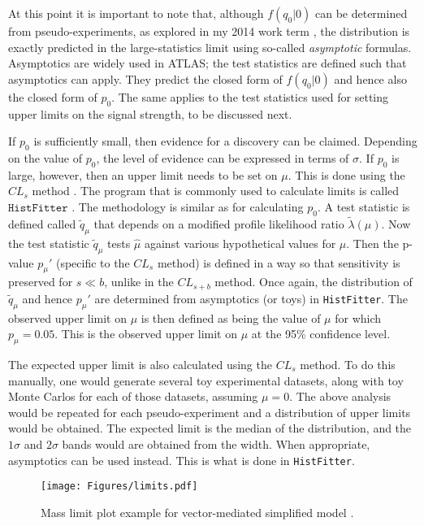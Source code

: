 At this point it is important to note that, although $f(q_0 | 0)$ can be determined from pseudo-experiments, as explored in my 2014 work term \cite{McLean}, the distribution is exactly predicted in the large-statistics limit using so-called \textit{asymptotic} formulas. Asymptotics are widely used in ATLAS; the test statistics are defined such that asymptotics can apply. They predict the closed form of $f(q_0 | 0)$ and hence also the closed form of $p_0$. The same applies to the test statistics used for setting upper limits on the signal strength, to be discussed next. 

If $p_0$ is sufficiently small, then evidence for a discovery can be claimed. Depending on the value of $p_0$, the level of evidence can be expressed in terms of $\sigma$. If $p_0$ is large, however, then an upper limit needs to be set on $\mu$. This is done using the $CL_s$ method \cite{CLsInfo}. The program that is commonly used to calculate limits is called $\texttt{HistFitter}$ \cite{Baak:2014wma}. The methodology is similar as for calculating $p_0$. A test statistic is defined called $\tilde{q}_\mu$ that depends on a modified profile likelihood ratio $\tilde{\lambda}(\mu)$. Now the test statistic $\tilde{q}_\mu$ tests $\hat{\mu}$ against various hypothetical values for $\mu$. Then the p-value $p_\mu'$ (specific to the $CL_s$ method) is defined in a way so that sensitivity is preserved for $s \ll b$, unlike in the $CL_{s+b}$ method. Once again, the distribution of $\tilde{q}_\mu$ and hence $p_\mu'$ are determined from asymptotics (or toys) in \texttt{HistFitter}. The observed upper limit on $\mu$ is then defined as being the value of $\mu$ for which $p_\mu = 0.05$. This is the observed upper limit on $\mu$ at the 95\% confidence level.

The expected upper limit is also calculated using the $CL_s$ method. To do this manually, one would generate several toy experimental datasets, along with toy Monte Carlos for each of those datasets, assuming $\mu=0$. The above analysis would be repeated for each pseudo-experiment and a distribution of upper limits would be obtained. The expected limit is the median of the distribution, and the $1\sigma$ and $2\sigma$ bands would are obtained from the width. When appropriate, asymptotics can be used instead. This is what is done in \texttt{HistFitter}.

\begin{figure}[h]
\centering
\texttt{[image: Figures/limits.pdf]}
\caption[Mass limit plot example for vector-mediated simplified model]{Mass limit plot example for vector-mediated simplified model \cite{Boveia:2016mrp}.}
\label{fig:limits}
\end{figure}

